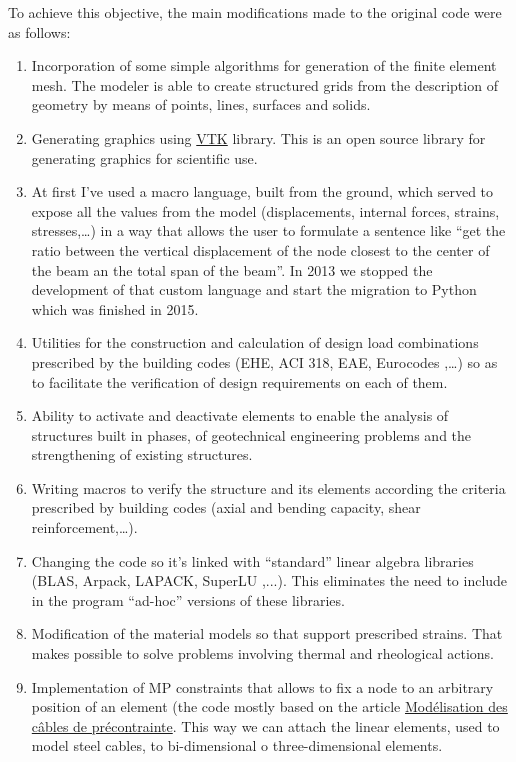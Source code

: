 To achieve this objective, the main modifications made to the original code were as follows:

\begin{enumerate}
\item Incorporation of some simple algorithms for generation of the finite element mesh. The modeler is able to create structured grids from the description of geometry by means of points, lines, surfaces and solids.

\item Generating graphics using \href{http://www.vtk.org}{VTK} library. This is an open source library for generating graphics for scientific use. 

\item At first I've used a macro language, built from the ground, which served to expose all the values from the model (displacements, internal forces, strains, stresses,\ldots) in a way that allows the user to formulate a sentence like ``get the ratio between the vertical displacement of the node closest to the center of the beam an the total span of the beam''. In 2013 we stopped the development of that custom language and start the migration to Python which was finished in 2015. 

\item Utilities for the construction and calculation of design load combinations prescribed by the building codes (EHE, ACI 318, EAE, Eurocodes ,\ldots) so as to facilitate the verification of design requirements on each of them.

\item Ability to activate and deactivate elements to enable the analysis of structures built in phases, of geotechnical engineering problems and the strengthening of existing structures.

\item Writing macros to verify the structure and its elements according the criteria prescribed by building codes (axial and bending capacity, shear reinforcement,\ldots).

\item Changing the code so it's linked with ``standard'' linear algebra libraries (BLAS, Arpack, LAPACK, SuperLU ,...). This eliminates the need to include in the program ``ad-hoc'' versions of these libraries.

\item Modification of the material models so that support prescribed strains. That makes possible to solve problems involving thermal and rheological actions.

\item Implementation of MP constraints that allows to fix a node to an arbitrary position of an element (the code mostly based on the article \href{http://www.code-aster.org/V2/doc/v10/fr/man_r/r7/r7.01.02.pdf}{Modélisation des câbles de précontrainte}. This way we can attach the linear elements, used to model steel cables, to bi-dimensional o three-dimensional elements.

\end{enumerate}

